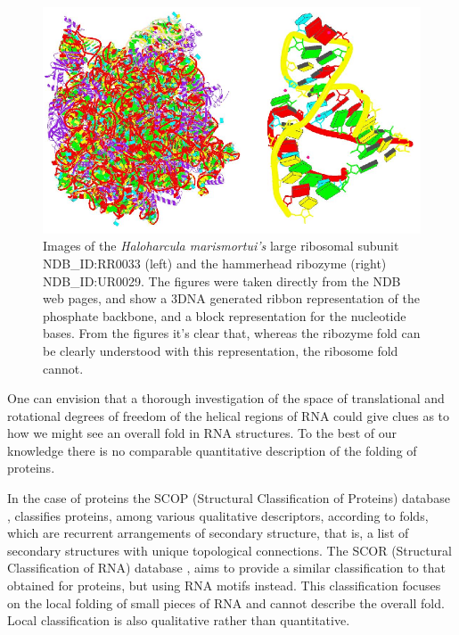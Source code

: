 \begin{figure}[t]
\centering
\includegraphics[scale=0.5]{Chapter1/ribosome_ribozyme.png}
\caption{Images   of  the  \textit{Haloharcula   marismortui's}  large
  ribosomal subunit NDB\_ID:RR0033 (left) and the hammerhead ribozyme
  (right) NDB\_ID:UR0029.
  The  figures were taken directly  from the NDB
  web  pages,   and  show  a  3DNA   generated  \cite{lu2008b}  ribbon
  representation of the phosphate backbone, and a block representation
  for the nucleotide bases. From  the figures it's clear that, whereas
  the   ribozyme   fold   can   be  clearly   understood   with   this
  representation, the ribosome fold cannot.}
\label{fig:ribosome}
\end{figure}

One  can  envision that  a  thorough  investigation  of the  space  of
translational and rotational degrees of freedom of the helical regions
of RNA could give clues as to  how we might see an overall fold in RNA
structures.  To the  best  of  our knowledge  there  is no  comparable
quantitative description of the folding of proteins.

In  the  case  of  proteins  the SCOP  (Structural  Classification  of
Proteins)  database  \cite{andreeva2004},  classifies proteins,  among
various  qualitative  descriptors,   according  to  folds,  which  are
recurrent  arrangements of  secondary structure,  that is,  a  list of
secondary  structures with  unique topological  connections.  The SCOR
(Structural  Classification  of  RNA)  database  \cite{klosterman2002,
  klosterman2004}, aims  to provide  a similar classification  to that
obtained   for  proteins,   but   using  RNA   motifs  instead.   This
classification focuses on the local folding of small pieces of RNA and
cannot  describe  the  overall  fold.  Local  classification  is  also
qualitative rather than quantitative.

